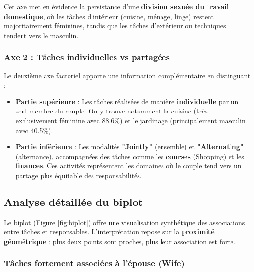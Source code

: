 \documentclass[12pt,a4paper]{article}
\begin{document}
Cet axe met en évidence la persistance d'une \textbf{division sexuée du travail domestique}, où les tâches d'intérieur (cuisine, ménage, linge) restent majoritairement féminines, tandis que les tâches d'extérieur ou techniques tendent vers le masculin.

\subsubsection{Axe 2 : Tâches individuelles vs partagées}

Le deuxième axe factoriel apporte une information complémentaire en distinguant :

\begin{itemize}
    \item \textbf{Partie supérieure} : Les tâches réalisées de manière \textbf{individuelle} par un seul membre du couple. On y trouve notamment la cuisine (très exclusivement féminine avec 88.6\%) et le jardinage (principalement masculin avec 40.5\%).
    
    \item \textbf{Partie inférieure} : Les modalités \textbf{"Jointly"} (ensemble) et \textbf{"Alternating"} (alternance), accompagnées des tâches comme les \textbf{courses} (Shopping) et les \textbf{finances}. Ces activités représentent les domaines où le couple tend vers un partage plus équitable des responsabilités.
\end{itemize}

\subsection{Analyse détaillée du biplot}

Le biplot (Figure \ref{fig:biplot}) offre une visualisation synthétique des associations entre tâches et responsables. L'interprétation repose sur la \textbf{proximité géométrique} : plus deux points sont proches, plus leur association est forte.

\subsubsection{Tâches fortement associées à l'épouse (Wife)}
\end{document}
